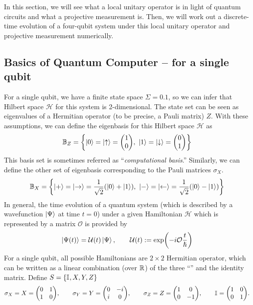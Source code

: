 \documentclass[11pt, oneside, listof=totoc]{scrbook}
\renewcommand{\H}{\mathcal{H}}
\renewcommand{\O}{\mathcal{O}}
\newcommand{\ku}{\ket{0}}
\newcommand{\kd}{\ket{1}}
\newcommand{\kr}{\ket{+}}
\newcommand{\kl}{\ket{-}}
\newcommand{\UU}{\mathcal{U}}
\begin{document}
In this section, we will see what a local unitary operator is in light of quantum circuits and what a projective measurement is. Then, we will work out a discrete-time evolution of a four-qubit system under this local unitary operator and projective measurement numerically.

\subsection{Basics of Quantum Computer -- for a single qubit}\label{ssec:quantum-computer}
For a single qubit, we have a finite state space \(\Sigma = \qty{0, 1}\), so we can infer that Hilbert space \(\H\) for this system is 2-dimensional. The state set can be seen as eigenvalues of a Hermitian operator (to be precise, a Pauli matrix) \(Z\). With these assumptions, we can define the eigenbasis for this Hilbert space \(\H\) as
\begin{equation}
    \B_Z = \qty{\ku = \ket{\uparrow} = \mqty(1 \\ 0),~ \kd= \ket{\downarrow} = \mqty(0 \\ 1)}
\end{equation}
This basis set is sometimes referred as ``\emph{computational basis}.'' Similarly, we can define the other set of eigenbasis corresponding to the Pauli matrices \(\sigma_X\).
\begin{equation}
    \B_X = \qty{\kr = \ket{\rightarrow} = \frac{1}{\sqrt{2}} \qty(\ku + \kd),~ \kl = \ket{\leftarrow} = \frac{1}{\sqrt{2}} \qty(\ku - \kd)}
\end{equation}
In general, the time evolution of a quantum system (which is described by a wavefunction \(\ket{\Psi}\) at time \(t = 0\)) under a given Hamiltonian \(\mathscr{H}\) which is represented by a matrix \(\O\) is provided by
\[
    \ket{\Psi (t)} = \UU(t) \ket{\Psi}, \qquad \UU(t) := \exp(- i \O \frac{t}{\hslash})
\]
For a single qubit, all possible Hamiltonians are \(2 \times 2\) Hermitian operator, which can be written as a linear combination (over \(\mathbb R\)) of the three ``'' and the identity matrix. Define \(S = \qty{\mathbb{I}_{}, X, Y, Z}\)
\begin{equation}
    \sigma_X = X = \mqty(0 & 1 \\ 1 & 0), \qquad \sigma_Y = Y = \mqty(0 & -i \\ i & 0), \qquad \sigma_Z = Z = \mqty(1 & 0 \\ 0 & -1), \qquad \I{} = \mqty(1 & 0 \\ 0 & 1).
\end{equation}
\end{document}
